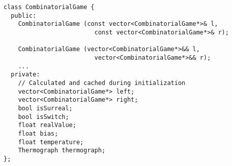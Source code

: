 \begin{verbatim}
class CombinatorialGame {
  public:
	CombinatorialGame (const vector<CombinatorialGame*>& l,
					     const vector<CombinatorialGame*>& r);			   
					   
	CombinatorialGame (vector<CombinatorialGame*>&& l,
					     vector<CombinatorialGame*>&& r);
	...
  private:
  	// Calculated and cached during initialization
  	vector<CombinatorialGame*> left;
  	vector<CombinatorialGame*> right;
  	bool isSurreal;
  	bool isSwitch;
  	float realValue;
  	float bias;
  	float temperature;
  	Thermograph thermograph;
};

\end{verbatim}
